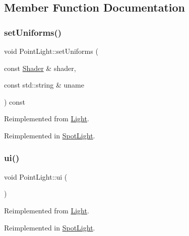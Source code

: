 \subsection{Member Function Documentation}
\mbox{\label{classPointLight_abf6f298a0d04b636e22a3a5903e5b823}} 
\subsubsection{\texorpdfstring{set\+Uniforms()}{setUniforms()}}
{\footnotesize\ttfamily void Point\+Light\+::set\+Uniforms (\begin{DoxyParamCaption}\item[{const \hyperlink{classShader}{Shader} \&}]{shader,  }\item[{const std\+::string \&}]{uname }\end{DoxyParamCaption}) const\hspace{0.3cm}{\ttfamily [virtual]}}



Reimplemented from \hyperlink{classLight_adfffa53d21bbeaa638c0bc5ae5a852cc}{Light}.



Reimplemented in \hyperlink{classSpotLight_a4599dbd0a665514ff7066bfa01d04d1e}{Spot\+Light}.

\mbox{\label{classPointLight_a538a42e0d1d713c57e46e492d352b34e}} 
\subsubsection{\texorpdfstring{ui()}{ui()}}
{\footnotesize\ttfamily void Point\+Light\+::ui (\begin{DoxyParamCaption}{ }\end{DoxyParamCaption})\hspace{0.3cm}{\ttfamily [virtual]}}



Reimplemented from \hyperlink{classLight_a15770d3a4b173cd517477dfb5d5bcab9}{Light}.



Reimplemented in \hyperlink{classSpotLight_a7ca46a2356ceb4f193704632e1f17bb4}{Spot\+Light}.



